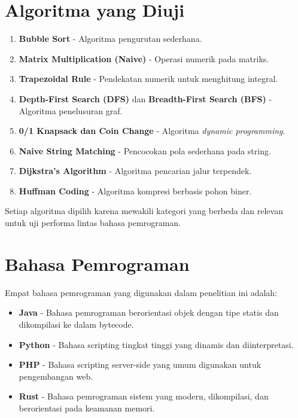 \section{Algoritma yang Diuji}
\label{sec:algoritmaDiuji}
\begin{enumerate}
	\item \textbf{Bubble Sort} - Algoritma pengurutan sederhana.
	\item \textbf{Matrix Multiplication (Naive)} - Operasi numerik pada matriks.
	\item \textbf{Trapezoidal Rule} - Pendekatan numerik untuk menghitung integral.
	\item \textbf{Depth-First Search (DFS)} dan \textbf{Breadth-First Search (BFS)} - Algoritma penelusuran graf.
	\item \textbf{0/1 Knapsack dan Coin Change} - Algoritma \textit{dynamic programming}.
	\item \textbf{Naive String Matching} - Pencocokan pola sederhana pada string.
	\item \textbf{Dijkstra’s Algorithm} - Algoritma pencarian jalur terpendek.
	\item \textbf{Huffman Coding} - Algoritma kompresi berbasis pohon biner.
\end{enumerate}

Setiap algoritma dipilih karena mewakili kategori yang berbeda dan relevan untuk uji performa lintas bahasa pemrograman.

\section{Bahasa Pemrograman}
Empat bahasa pemrograman yang digunakan dalam penelitian ini adalah:
\begin{itemize}
	\item \textbf{Java} - Bahasa pemrograman berorientasi objek dengan tipe statis dan dikompilasi ke dalam bytecode.
	\item \textbf{Python} - Bahasa scripting tingkat tinggi yang dinamis dan diinterpretasi.
	\item \textbf{PHP} - Bahasa scripting server-side yang umum digunakan untuk pengembangan web.
	\item \textbf{Rust} - Bahasa pemrograman sistem yang modern, dikompilasi, dan berorientasi pada keamanan memori.
\end{itemize}

